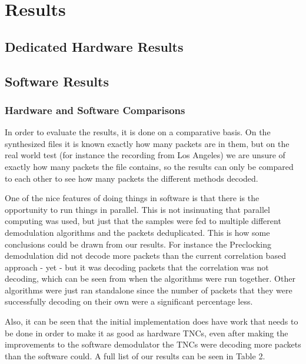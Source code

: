 \chapter{Results}

\section{Dedicated Hardware Results}

\section{Software Results}

\subsection{Hardware and Software Comparisons}

In order to evaluate the results, it is done on a comparative basis. On the synthesized files it is known exactly how many packets are in them, but on the real world test (for instance the recording from Los Angeles) we are unsure of exactly how many packets the file contains, so the results can only be compared to each other to see how many packets the different methods decoded.

One of the nice features of doing things in software is that there is the opportunity to run things in parallel. This is not insinuating that parallel computing was used, but just that the samples were fed to multiple different demodulation algorithms and the packets deduplicated. This is how some conclusions could be drawn from our results. For instance the Preclocking demodulation did not decode more packets than the current correlation based approach - yet - but it was decoding packets that the correlation was not decoding, which can be seen from when the algorithms were run together. Other algorithms were just ran standalone since the number of packets that they were successfully decoding on their own were a significant percentage less.

Also, it can be seen that the initial implementation does have work that needs to be done in order to make it as good as hardware TNCs, even after making the improvements to the software demodulator the TNCs were decoding more packets than the software could. A full list of our results can be seen in Table 2.
